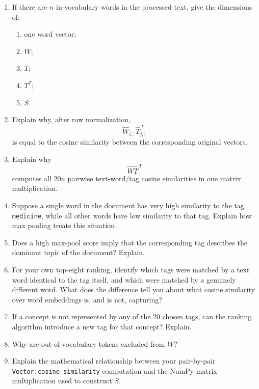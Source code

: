 \documentclass[12pt]{article}
\begin{document}
\begin{enumerate}

    \item If there are \(n\) in-vocabulary words in the processed text,
    give the dimensions of:
    \begin{enumerate}
        \item one word vector;
        \item \(W\);
        \item \(T\);
        \item \(T^T\);
        \item \(S\).
    \end{enumerate}

    \item Explain why, after row normalization,
    \[
    \widehat{W}_{i,:}
    \widehat{T}_{j,:}^{\,T}
    \]
    is equal to the cosine similarity between the corresponding
    original vectors.

    \item Explain why
    \[
    \widehat{W}\widehat{T}^{\,T}
    \]
    computes all \(20n\) pairwise text-word/tag cosine similarities
    in one matrix multiplication.

    \item Suppose a single word in the document has very high
    similarity to the tag \texttt{medicine}, while all other words
    have low similarity to that tag. Explain how max pooling treats
    this situation.

    \item Does a high max-pool score imply that the corresponding tag
    describes the dominant topic of the document? Explain.

    \item For your own top-eight ranking, identify which tags were
    matched by a text word identical to the tag itself, and which
    were matched by a genuinely different word. What does the
    difference tell you about what cosine similarity over word
    embeddings is, and is not, capturing?

    \item If a concept is not represented by any of the 20 chosen
    tags, can the ranking algorithm introduce a new tag for that
    concept? Explain.

    \item Why are out-of-vocabulary tokens excluded from \(W\)?

    \item Explain the mathematical relationship between your
    pair-by-pair \texttt{Vector.cosine\_similarity} computation and
    the NumPy matrix multiplication used to construct \(S\).

\end{enumerate}
\end{document}
